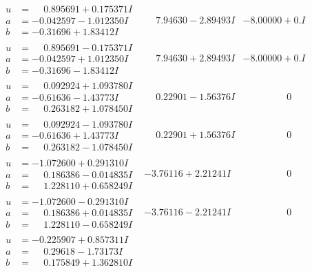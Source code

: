 \documentclass[1p]{elsarticle_modified}
\theoremstyle{definition}
\begin{document}
$$\begin{array}{c|c|c}
\begin{aligned}
u &= \phantom{-}0.895691 + 0.175371 I \\
a &= -0.042597 - 1.012350 I \\
b &= -0.31696 + 1.83412 I\end{aligned}
 & \phantom{-}7.94630 - 2.89493 I & -8.00000 + 0. I\phantom{ +0.000000I} \\ \hline\begin{aligned}
u &= \phantom{-}0.895691 - 0.175371 I \\
a &= -0.042597 + 1.012350 I \\
b &= -0.31696 - 1.83412 I\end{aligned}
 & \phantom{-}7.94630 + 2.89493 I & -8.00000 + 0. I\phantom{ +0.000000I} \\ \hline\begin{aligned}
u &= \phantom{-}0.092924 + 1.093780 I \\
a &= -0.61636 - 1.43773 I \\
b &= \phantom{-}0.263182 + 1.078450 I\end{aligned}
 & \phantom{-}0.22901 - 1.56376 I & \phantom{-0.000000 } 0 \\ \hline\begin{aligned}
u &= \phantom{-}0.092924 - 1.093780 I \\
a &= -0.61636 + 1.43773 I \\
b &= \phantom{-}0.263182 - 1.078450 I\end{aligned}
 & \phantom{-}0.22901 + 1.56376 I & \phantom{-0.000000 } 0 \\ \hline\begin{aligned}
u &= -1.072600 + 0.291310 I \\
a &= \phantom{-}0.186386 - 0.014835 I \\
b &= \phantom{-}1.228110 + 0.658249 I\end{aligned}
 & -3.76116 + 2.21241 I & \phantom{-0.000000 } 0 \\ \hline\begin{aligned}
u &= -1.072600 - 0.291310 I \\
a &= \phantom{-}0.186386 + 0.014835 I \\
b &= \phantom{-}1.228110 - 0.658249 I\end{aligned}
 & -3.76116 - 2.21241 I & \phantom{-0.000000 } 0 \\ \hline\begin{aligned}
u &= -0.225907 + 0.857311 I \\
a &= \phantom{-}0.29618 - 1.73173 I \\
b &= \phantom{-}0.175849 + 1.362810 I\end{aligned}

\end{array}$$
\end{document}
